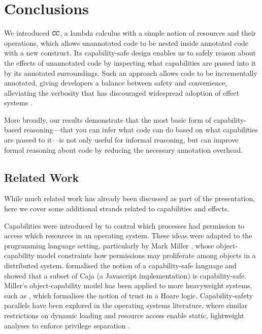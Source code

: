 \section{Conclusions}

We introduced $\mathtt{CC}$, a lambda calculus with a simple notion of resources and
their operations, which allows unannotated code to be nested inside annotated code
with a new  construct. Its capability-safe design enables us to safely
reason about the effects of unannotated code by inspecting what capabilities are
passed into it by its annotated surroundings. Such an approach allows code to be
incrementally annotated, giving developers a balance between safety and convenience,
alleviating the verbosity that has discouraged widespread adoption of effect systems
\cite{rytz12}.

More broadly, our results demonstrate that the most basic form of capability-based reasoning---that you can infer what code can do based on what capabilities are passed to it---is not only useful for informal reasoning, but can improve formal reasoning about code by reducing the necessary annotation overhead.

\subsection{Related Work}

While much related work has already been discussed as part of the presentation, here we cover some additional strands related to capabilities and effects.

Capabilities were introduced by \cite{dennis66} to control which processes had
permission to access which resources in an operating system.
These ideas were adapted to the programming language setting, particularly by
Mark Miller \cite{miller06}, whose object-capability model constraints how permissions
may proliferate among objects in a distributed system. \cite{maffeis10} formalised
the notion of a capability-safe language and showed that a subset of Caja (a
Javascript implementation) is capability-safe. Miller's object-capability model has been
applied to more heavyweight systems, such as \cite{drossopoulou07}, which
formalises the notion of trust in a Hoare logic. Capability-safety parallels have been
explored in the operating systems literature, where similar restrictions on dynamic
 loading and resource access \cite{hunt07} enable static, lightweight analyses to
  enforce privilege separation \cite{madhavapeddy13}.

